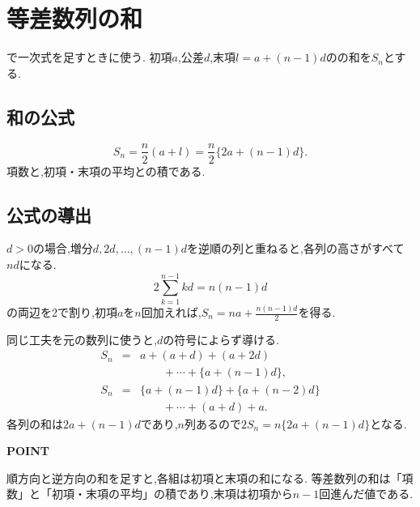 
\section{等差数列の和}\label{節：等差数列の和}
で一次式を足すときに使う.
初項$a$,公差$d$,末項$l=a+(n-1)d$のの和を$S_n$とする.

\subsection{和の公式}\label{節：等差数列の和：和の公式}
\[
  S_n=\frac n2(a+l)=\frac n2\{2a+(n-1)d\}.
\]
項数と,初項・末項の平均との積である.

\subsection{公式の導出}\label{節：等差数列の和：公式の導出}
$d>0$の場合,増分$d,2d,\ldots,(n-1)d$を逆順の列と重ねると,各列の高さがすべて$nd$になる.
\[
  2\sum_{k=1}^{n-1}kd=n(n-1)d
\]
の両辺を2で割り,初項$a$を$n$回加えれば,$S_n=na+\frac{n(n-1)d}{2}$を得る.
\BookFigArithmeticSum

同じ工夫を元の数列に使うと,$d$の符号によらず導ける.
\[
  \begin{array}{rcl}
    S_n&=&a+(a+d)+(a+2d)\\
    &&\qquad+\cdots+\{a+(n-1)d\},\\
    S_n&=&\{a+(n-1)d\}+\{a+(n-2)d\}\\
    &&\qquad+\cdots+(a+d)+a.
  \end{array}
\]
各列の和は$2a+(n-1)d$であり,$n$列あるので$2S_n=n\{2a+(n-1)d\}$となる.

\begin{bookpoint}
  \textbf{POINT}\par
  順方向と逆方向の和を足すと,各組は初項と末項の和になる.
  等差数列の和は「項数」と「初項・末項の平均」の積であり,末項は初項から$n-1$回進んだ値である.
\end{bookpoint}
